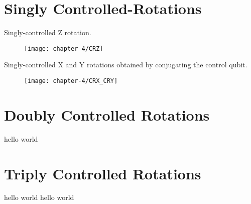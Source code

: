 \section{Singly Controlled-Rotations}

Singly-controlled Z rotation.

\begin{figure}[hb]
    \centering
    \texttt{[image: chapter-4/CRZ]}
\end{figure}

Singly-controlled X and Y rotations obtained by conjugating the control qubit.

\begin{figure}[hb]
    \centering
    \texttt{[image: chapter-4/CRX\_CRY]}
\end{figure}

\section{Doubly Controlled Rotations}
hello world


\section{Triply Controlled Rotations}
hello world
hello world

